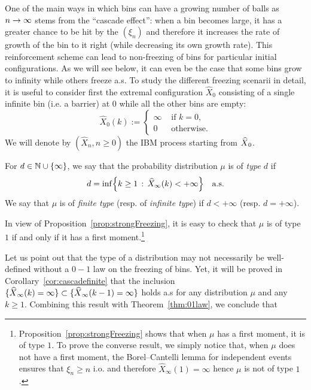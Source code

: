 \documentclass[AHL,Unicode,longabstracts,published]{cedram}
\newcommand{\bbN}{\mathbb{N}}
\let\originalleft\left
\let\originalright\right
\renewcommand{\left}{\mathopen{}\mathclose\bgroup\originalleft}
\renewcommand{\right}{\aftergroup\egroup\originalright}
\let\oldin\in
\renewcommand{\in}{\mathchoice{\oldin}{\oldin}{\,\oldin\,}{\,\oldin\,}}
\renewcommand*{\to}{\mathchoice{\longrightarrow}{\rightarrow}{\rightarrow}{\rightarrow}}
\let\oldhat\hat
\renewcommand*{\hat}[1]{\mathchoice{\widehat{#1}}{\widehat{#1}}{\oldhat{#1}}{\oldhat{#1}}}
\begin{document}
One of the main ways in which bins can have a growing number of balls as $n \to \infty$ stems from the ``cascade effect'': when a bin becomes large, it has a greater chance to be hit by the $(\xi_n)$ and therefore it increases the rate of growth of the bin to it right (while decreasing its own growth rate). This reinforcement scheme can lead to non-freezing of bins for particular initial configurations. As we will see below, it can even be the case that some bins grow to infinity while others freeze a.s. To study the different freezing scenarii in detail, it is useful to consider first the extremal configuration $\widehat{X}_0$ consisting of a single infinite bin (i.e. a barrier) at $0$ while all the other bins are empty:
\begin{equation}\label{def:widehatX}
\widehat{X}_0(k)
:=
\begin{cases}
\infty & \text{ if } k = 0,\\
0 & \text{ otherwise}.
\end{cases}
\end{equation}
We will denote by $(\widehat{X}_n, n \geq 0)$ the IBM process starting from $\hat{X}_0$.

\begin{defi}\label{def:classification}
For $d \in \bbN \cup \{\infty\}$, we say that the probability distribution $\mu$ is of \emph{type $d$} if
\[
d =\inf\left\{k\geq 1 \,:\, \widehat{X}_\infty(k) < +\infty \right\} \quad \text{a.s.}
\]
We say that $\mu$ is of \emph{finite type} (resp. of \emph{infinite type}) if $d <+\infty$ (resp. $d =+\infty$).
\end{defi}

In view of Proposition~\ref{prop:strongFreezing}, it is easy to check that $\mu$ is of type $1$ if and only if it has a first moment.\footnote{Proposition~\ref{prop:strongFreezing} shows that when $\mu$ has a first moment, it is of type $1$. To prove the converse result, we simply notice that, when $\mu$ does not have a first moment, the Borel--Cantelli lemma for independent events ensures that $\xi_n \geq n$ i.o. and therefore $\widehat{X}_\infty(1) = \infty$ hence $\mu$ is not of type $1$.}

Let us point out that the type of a distribution may not necessarily be well-defined without a $0-1$ law on the freezing of bins. Yet, it will be proved in Corollary~\ref{cor:cascadefinite} that the inclusion $\{\hat X_\infty(k) = \infty\} \subset \{ \hat X_\infty(k-1) = \infty \}$ holds a.s for any distribution $\mu$ and any $k\geq1$. Combining this result with Theorem~\ref{thm:01law}, we conclude that
\end{document}
